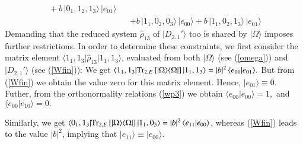 {\begin{eqnarray}
 \ +b\,  \vert 0_1,1_2,1_3\rangle\,\vert e_{01}\rangle\nonumber \\ 
 &&+ b\,  \vert 1_1,0_2,0_3\rangle\,\vert e_{00}\rangle  
+ b\,  \vert 1_1,0_2,1_3\rangle\,\vert e_{01}\rangle
\end{eqnarray} 
Demanding that the reduced system $\hat{\rho}_{13}$ of $\vert D_{2,1}'\rangle$  too is shared by $\vert 
\Omega\rangle$ imposes further restrictions. 
In order to determine these constraints, 
we first consider the matrix element $\langle 1_1,1_3\vert\hat{\rho}_{13}\vert 1_1,1_3\rangle$, evaluated from both  
$\vert\Omega\rangle$ (see (\ref{omega})) and $\vert D_{2,1}'\rangle$  (see (\ref{Wfin})): 
We get
 $\langle 1_1,1_3\vert{\rm Tr}_{2,E}\, [\vert\Omega\rangle\langle\Omega\vert]\, \vert 1_1,1_3\rangle=\vert %
b\vert ^2\, \langle e_{01}\vert e_{01}\rangle.$  
But  from (\ref{Wfin}) we obtain  the value zero for this matrix element.  
Hence, $\vert e_{01}\rangle\equiv 0.$ 
Futher, from the orthonormality relations (\ref{wp3}) 
 we obtain $\langle e_{00}\vert e_{00}\rangle=1,$ 
 and $\langle e_{00}\vert e_{10}\rangle=0.$ 

Similarly, we get $\langle 0_1,1_3\vert{\rm Tr}_{2,E}\, [\vert\Omega\rangle\langle\Omega\vert]\, \vert %
1_1,0_3\rangle=\vert b\vert^2\, \langle e_{11}\vert e_{00}\rangle$,  
whereas  (\ref{Wfin}) leads to the value $\vert b\vert^2$, implying that $\vert e_{11}\rangle\equiv \vert %
e_{00}\rangle.$ 
 
}
